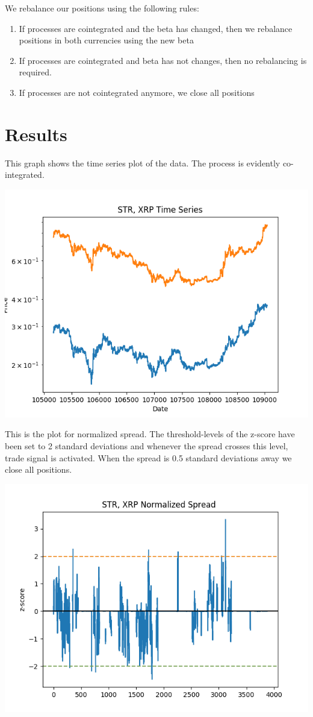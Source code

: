 \documentclass[12pt, letterpaper]{article}
\begin{document}
	We rebalance our positions using the following rules:
	\begin{enumerate}
		\item If processes are cointegrated and the beta has changed, then we rebalance positions in both currencies using the new beta
		\item If processes are cointegrated and beta has not changes, then no rebalancing is required.
		\item If processes are not cointegrated anymore, we close all positions
	\end{enumerate}
	
\newpage
\section{Results}
This graph shows the time series plot of the data. The process is evidently co-integrated.
\begin{center}
	\includegraphics[scale=.5]{time_series_z2.png}
\end{center}
This is the plot for normalized spread. The threshold-levels of the z-score have been set to 2 standard deviations and whenever the spread crosses this level, trade signal is activated. When the spread is 0.5 standard deviations away we close all positions.
\begin{center}
	\includegraphics[scale=.5]{spread_z2.png}
\end{center}
\end{document}

